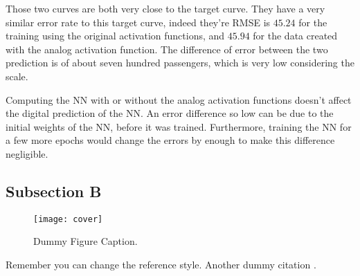 Those two curves are both very close to the target curve. They have a very similar error rate to this target curve, indeed they're \ac{RMSE} is $45.24$ for the training using the original activation functions, and $45.94$ for the data created with the analog activation function. The difference of error between the two prediction is of about seven hundred passengers, which is very low considering the scale.

Computing the \ac{NN} with or without the analog activation functions doesn't affect the digital prediction of the \ac{NN}. An error difference so low can be due to the initial weights of the \ac{NN}, before it was trained. Furthermore, training the \ac{NN} for a few more epochs would change the errors by enough to make this difference negligible.

\subsection{Subsection B}
\label{subsec:subbsectiona}

\begin{figure}[H]
  \centering
  \texttt{[image: cover]}
  \caption[Dummy Figure Caption for List of Figures.]{Dummy Figure Caption.}
  \label{fig:dummyfigure1}
\end{figure}

Remember you can change the reference style. Another dummy citation \cite{site}.
